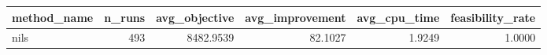 \begin{tabular}{lrrrrr}
\toprule
method_name & n_runs & avg_objective & avg_improvement & avg_cpu_time & feasibility_rate \\
\midrule
nils & 493 & 8482.9539 & 82.1027 & 1.9249 & 1.0000 \\
\bottomrule
\end{tabular}
